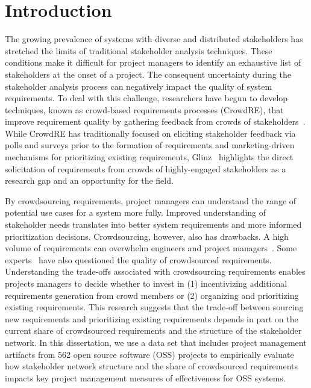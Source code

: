 \doublespacing
\chapter{Introduction} \label{chap:intro}

The growing prevalence of systems with diverse and distributed stakeholders has stretched the limits of traditional stakeholder analysis techniques. These conditions make it difficult for project managers to identify an exhaustive list of stakeholders at the onset of a project. The consequent uncertainty during the stakeholder analysis process can negatively impact the quality of system requirements. To deal with this challenge, researchers have begun to develop techniques, known as crowd-based requirements processes (CrowdRE), that improve requirement quality by gathering feedback from crowds of stakeholders~\cite{groen}. While CrowdRE has traditionally focused on eliciting stakeholder feedback via polls and surveys prior to the formation of requirements and marketing-driven mechanisms for prioritizing existing requirements, Glinz~\cite{glinz} highlights the direct solicitation of requirements from crowds of highly-engaged stakeholders as a research gap and an opportunity for the field.

By crowdsourcing requirements, project managers can understand the range of potential use cases for a system more fully. Improved understanding of stakeholder needs translates into better system requirements and more informed prioritization decisions. Crowdsourcing, however, also has drawbacks. A high volume of requirements can overwhelm engineers and project managers~\cite{groen}. Some experts~\cite{snijders} have also questioned the quality of crowdsourced requirements. Understanding the trade-offs associated with crowdsourcing requirements enables projects managers to decide whether to invest in (1) incentivizing additional requirements generation from crowd members or (2) organizing and prioritizing existing requirements. This research suggests that the trade-off between sourcing new requirements and prioritizing existing requirements depends in part on the current share of crowdsourced requirements and the structure of the stakeholder network. In this dissertation, we use a data set that includes project management artifacts from 562 open source software (OSS) projects to empirically evaluate how stakeholder network structure and the share of crowdsourced requirements impacts key project management measures of effectiveness for OSS systems.

